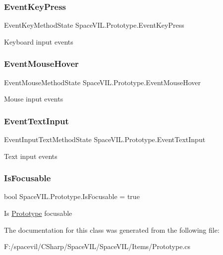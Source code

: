 \subsubsection{\texorpdfstring{Event\+Key\+Press}{EventKeyPress}}
{\footnotesize\ttfamily Event\+Key\+Method\+State Space\+V\+I\+L.\+Prototype.\+Event\+Key\+Press}



Keyboard input events 

\mbox{\label{class_space_v_i_l_1_1_prototype_aede77dddfe637d7c5395ad1cce5a7604}} 
\subsubsection{\texorpdfstring{Event\+Mouse\+Hover}{EventMouseHover}}
{\footnotesize\ttfamily Event\+Mouse\+Method\+State Space\+V\+I\+L.\+Prototype.\+Event\+Mouse\+Hover}



Mouse input events 

\mbox{\label{class_space_v_i_l_1_1_prototype_a582dbed570a2eea18c616d0994549a08}} 
\subsubsection{\texorpdfstring{Event\+Text\+Input}{EventTextInput}}
{\footnotesize\ttfamily Event\+Input\+Text\+Method\+State Space\+V\+I\+L.\+Prototype.\+Event\+Text\+Input}



Text input events 

\mbox{\label{class_space_v_i_l_1_1_prototype_acae2b941788e7a8e8c3a80fd1a4aa376}} 
\subsubsection{\texorpdfstring{Is\+Focusable}{IsFocusable}}
{\footnotesize\ttfamily bool Space\+V\+I\+L.\+Prototype.\+Is\+Focusable = true}



Is \mbox{\hyperlink{class_space_v_i_l_1_1_prototype}{Prototype}} focusable 



The documentation for this class was generated from the following file\+:\begin{DoxyCompactItemize}
\item 
F\+:/spacevil/\+C\+Sharp/\+Space\+V\+I\+L/\+Space\+V\+I\+L/\+Items/Prototype.\+cs\end{DoxyCompactItemize}
